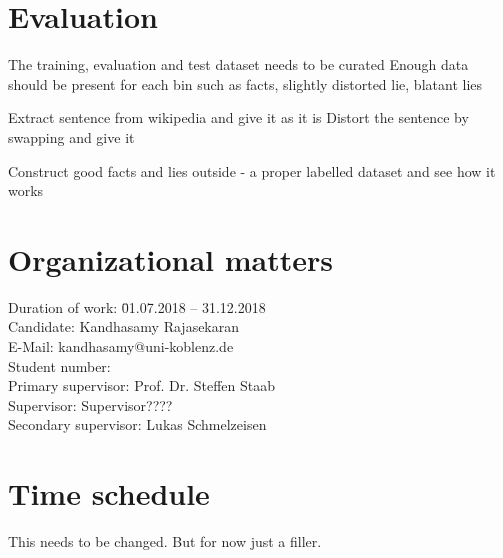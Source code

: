 \documentclass[a4paper, 11pt]{article}
\makeatletter
\newcommand{\myName}{Kandhasamy Rajasekaran}
\newcommand{\emailID}{kandhasamy@uni-koblenz.de}
\newcommand{\matriculationID}{216100855}
\newcommand{\StartDate}{01.07.2018}
\newcommand{\EndDate}{31.12.2018}
\newcommand{\expert}{Prof. Dr. Steffen Staab}%
\newcommand{\supervisor}{Supervisor????} %
\newcommand{\scndSupervisor}{Lukas Schmelzeisen} %
\makeatother
\begin{document}
\section{Evaluation}

The training, evaluation and test dataset needs to be curated
Enough data should be present for each bin such as facts, slightly distorted lie, blatant lies 

Extract sentence from wikipedia and give it as it is
Distort the sentence by swapping and give it 

Construct good facts and lies outside - a proper labelled dataset and see how it works
\newpage

\section{Organizational matters}

\begin{tabbing}
Duration of work: \hspace{1.1cm} \= \StartDate{} -- \EndDate{}\\
\vspace{0.5ex}Candidate:	\> \myName{}\\
\vspace{0.5ex}E-Mail:	\> \emailID{}\\
\vspace{0.5ex}Student number: \> \matriculationID{}\\
\vspace{0.5ex}Primary supervisor: \> \expert{}\\
Supervisor: \> \supervisor{}\\
Secondary supervisor: \> \scndSupervisor{}\\
\end{tabbing}


\section{Time schedule}

This needs to be changed. But for now just a filler.
\end{document}
